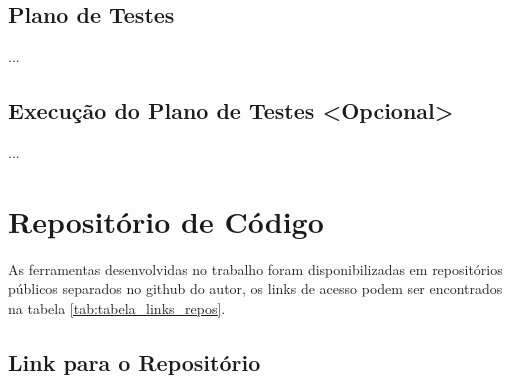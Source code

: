\subsection{Plano de Testes}
...

\subsection{Execução do Plano de Testes <Opcional>}
...

\section{Repositório de Código}
As ferramentas desenvolvidas no trabalho foram disponibilizadas em repositórios públicos separados no github do autor, os links de acesso podem ser encontrados na tabela \ref{tab:tabela_links_repos}.
\subsection{Link para o Repositório}

